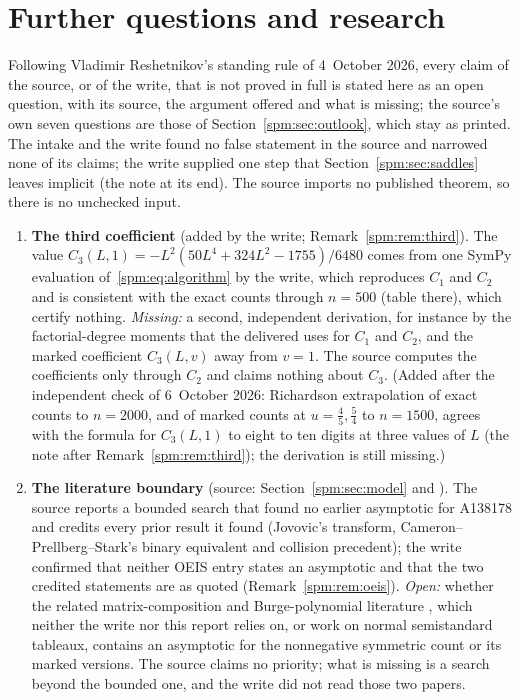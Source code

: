 \section{Further questions and research}\label{spm:sec:further}
\begin{writenote}
Following Vladimir Reshetnikov's standing rule of 4~October 2026, every
claim of the source, or of the write, that is not proved in full is stated
here as an open question, with its source, the argument offered and what
is missing; the source's own seven questions are those of
Section~\ref{spm:sec:outlook}, which stay as printed. The intake and the
write found no false statement in the source and narrowed none of its
claims; the write supplied one step that Section~\ref{spm:sec:saddles}
leaves implicit (the note at its end). The source imports no published
theorem, so there is no unchecked input.
\end{writenote}
\begin{enumerate}
\item\label{spm:q:third} \textbf{The third coefficient} (added by the
 write; Remark~\ref{spm:rem:third}). The value
 $C_3(L,1)=-L^2(50L^4+324L^2-1755)/6480$ comes from one SymPy evaluation
 of~\eqref{spm:eq:algorithm} by the write, which reproduces $C_1$ and $C_2$
 and is consistent with the exact counts through $n=500$ (table there),
 which certify nothing. \emph{Missing:} a
 second, independent derivation, for instance by the factorial-degree
 moments that the delivered  uses for
 $C_1$ and $C_2$, and the marked coefficient $C_3(L,v)$ away from $v=1$.
 The source computes the coefficients only through $C_2$ and claims
 nothing about $C_3$. \textup{(Added after the independent check of
 6~October 2026: Richardson extrapolation of exact counts to $n=2000$, and
 of marked counts at $u=\tfrac45,\tfrac54$ to $n=1500$, agrees with the
 formula for $C_3(L,1)$ to eight to ten digits at three values of $L$ (the
 note after Remark~\ref{spm:rem:third}); the derivation is still missing.)}
\item\label{spm:q:priority} \textbf{The literature boundary} (source:
 Section~\ref{spm:sec:model} and ). The source reports a
 bounded search that found no earlier asymptotic for A138178 and credits
 every prior result it found (Jovovic's transform,
 Cameron--Prellberg--Stark's binary equivalent and collision precedent);
 the write confirmed that neither OEIS entry states an asymptotic and that
 the two credited statements are as quoted (Remark~\ref{spm:rem:oeis}).
 \emph{Open:} whether the related matrix-composition and
 Burge-polynomial literature \cite{matrixcomp,caylerian}, which neither the
 write nor this report relies on, or work on normal semistandard tableaux,
 contains an asymptotic for the nonnegative symmetric count or its marked
 versions. The source claims no priority; what is missing is a search
 beyond the bounded one, and the write did not read those two papers.
\end{enumerate}
